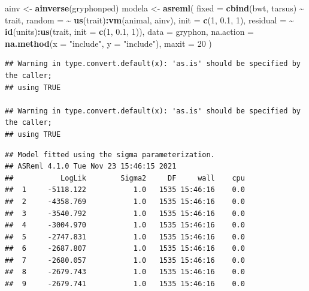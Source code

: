 \documentclass[
  12pt,
]{book}
\newenvironment{Shaded}{\begin{snugshade}}{\end{snugshade}}
\newcommand{\DataTypeTok}[1]{\textcolor[rgb]{0.13,0.29,0.53}{#1}}
\newcommand{\DecValTok}[1]{\textcolor[rgb]{0.00,0.00,0.81}{#1}}
\newcommand{\FloatTok}[1]{\textcolor[rgb]{0.00,0.00,0.81}{#1}}
\newcommand{\KeywordTok}[1]{\textcolor[rgb]{0.13,0.29,0.53}{\textbf{#1}}}
\newcommand{\NormalTok}[1]{#1}
\newcommand{\OperatorTok}[1]{\textcolor[rgb]{0.81,0.36,0.00}{\textbf{#1}}}
\newcommand{\StringTok}[1]{\textcolor[rgb]{0.31,0.60,0.02}{#1}}
\begin{document}
\begin{Shaded}
\begin{Highlighting}[]
\NormalTok{ainv \textless{}{-}}\StringTok{ }\KeywordTok{ainverse}\NormalTok{(gryphonped)}
\NormalTok{modela \textless{}{-}}\StringTok{ }\KeywordTok{asreml}\NormalTok{(}
  \DataTypeTok{fixed =} \KeywordTok{cbind}\NormalTok{(bwt, tarsus) }\OperatorTok{\textasciitilde{}}\StringTok{ }\NormalTok{trait,}
  \DataTypeTok{random =} \OperatorTok{\textasciitilde{}}\StringTok{ }\KeywordTok{us}\NormalTok{(trait)}\OperatorTok{:}\KeywordTok{vm}\NormalTok{(animal, ainv), }\DataTypeTok{init =} \KeywordTok{c}\NormalTok{(}\DecValTok{1}\NormalTok{, }\FloatTok{0.1}\NormalTok{, }\DecValTok{1}\NormalTok{),}
  \DataTypeTok{residual =} \OperatorTok{\textasciitilde{}}\StringTok{ }\KeywordTok{id}\NormalTok{(units)}\OperatorTok{:}\KeywordTok{us}\NormalTok{(trait, }\DataTypeTok{init =} \KeywordTok{c}\NormalTok{(}\DecValTok{1}\NormalTok{, }\FloatTok{0.1}\NormalTok{, }\DecValTok{1}\NormalTok{)),}
  \DataTypeTok{data =}\NormalTok{ gryphon,}
  \DataTypeTok{na.action =} \KeywordTok{na.method}\NormalTok{(}\DataTypeTok{x =} \StringTok{"include"}\NormalTok{, }\DataTypeTok{y =} \StringTok{"include"}\NormalTok{),}
  \DataTypeTok{maxit =} \DecValTok{20}
\NormalTok{)}
\end{Highlighting}
\end{Shaded}

\begin{verbatim}
## Warning in type.convert.default(x): 'as.is' should be specified by the caller;
## using TRUE

## Warning in type.convert.default(x): 'as.is' should be specified by the caller;
## using TRUE
\end{verbatim}

\begin{verbatim}
## Model fitted using the sigma parameterization.
## ASReml 4.1.0 Tue Nov 23 15:46:15 2021
##           LogLik        Sigma2     DF     wall    cpu
##  1     -5118.122           1.0   1535 15:46:16    0.0
##  2     -4358.769           1.0   1535 15:46:16    0.0
##  3     -3540.792           1.0   1535 15:46:16    0.0
##  4     -3004.970           1.0   1535 15:46:16    0.0
##  5     -2747.831           1.0   1535 15:46:16    0.0
##  6     -2687.807           1.0   1535 15:46:16    0.0
##  7     -2680.057           1.0   1535 15:46:16    0.0
##  8     -2679.743           1.0   1535 15:46:16    0.0
##  9     -2679.741           1.0   1535 15:46:16    0.0
\end{verbatim}
\end{document}
